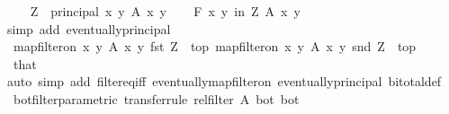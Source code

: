 \begin{isabellebody}
%
\isadelimproof
%
\endisadelimproof
%
\isatagproof
{}\isamarkupfalse%
\isanewline
\ \ \isamarkupfalse%
\ {\isacharquery}{\kern0pt}Z\ {\isacharequal}{\kern0pt}\ {\isachardoublequoteopen}principal\ {\isacharbraceleft}{\kern0pt}{\isacharparenleft}{\kern0pt}x{\isacharcomma}{\kern0pt}\ y{\isacharparenright}{\kern0pt}{\isachardot}{\kern0pt}\ A\ x\ y{\isacharbraceright}{\kern0pt}{\isachardoublequoteclose}\isanewline
\ \ \isamarkupfalse%
\ {\isachardoublequoteopen}{\isasymforall}\isactrlsub F\ {\isacharparenleft}{\kern0pt}x{\isacharcomma}{\kern0pt}\ y{\isacharparenright}{\kern0pt}\ in\ {\isacharquery}{\kern0pt}Z{\isachardot}{\kern0pt}\ A\ x\ y{\isachardoublequoteclose}\ \isamarkupfalse%
{\isacharparenleft}{\kern0pt}simp\ add{\isacharcolon}{\kern0pt}\ eventually{\isacharunderscore}{\kern0pt}principal{\isacharparenright}{\kern0pt}\isanewline
\ \ \isamarkupfalse%
\ {\isachardoublequoteopen}map{\isacharunderscore}{\kern0pt}filter{\isacharunderscore}{\kern0pt}on\ {\isacharbraceleft}{\kern0pt}{\isacharparenleft}{\kern0pt}x{\isacharcomma}{\kern0pt}\ y{\isacharparenright}{\kern0pt}{\isachardot}{\kern0pt}\ A\ x\ y{\isacharbraceright}{\kern0pt}\ fst\ {\isacharquery}{\kern0pt}Z\ {\isacharequal}{\kern0pt}\ top{\isachardoublequoteclose}\ {\isachardoublequoteopen}map{\isacharunderscore}{\kern0pt}filter{\isacharunderscore}{\kern0pt}on\ {\isacharbraceleft}{\kern0pt}{\isacharparenleft}{\kern0pt}x{\isacharcomma}{\kern0pt}\ y{\isacharparenright}{\kern0pt}{\isachardot}{\kern0pt}\ A\ x\ y{\isacharbraceright}{\kern0pt}\ snd\ {\isacharquery}{\kern0pt}Z\ {\isacharequal}{\kern0pt}\ top{\isachardoublequoteclose}\isanewline
\ \ \ \ \isamarkupfalse%
\ that\ \isamarkupfalse%
{\isacharparenleft}{\kern0pt}auto\ simp\ add{\isacharcolon}{\kern0pt}\ filter{\isacharunderscore}{\kern0pt}eq{\isacharunderscore}{\kern0pt}iff\ eventually{\isacharunderscore}{\kern0pt}map{\isacharunderscore}{\kern0pt}filter{\isacharunderscore}{\kern0pt}on\ eventually{\isacharunderscore}{\kern0pt}principal\ bi{\isacharunderscore}{\kern0pt}total{\isacharunderscore}{\kern0pt}def{\isacharparenright}{\kern0pt}\isanewline
{}\isamarkupfalse%
%
\endisatagproof
{\isafoldproof}%
%
\isadelimproof
\isanewline
%
\endisadelimproof
\isanewline
{}\isamarkupfalse%
\ bot{\isacharunderscore}{\kern0pt}filter{\isacharunderscore}{\kern0pt}parametric\ {\isacharbrackleft}{\kern0pt}transfer{\isacharunderscore}{\kern0pt}rule{\isacharbrackright}{\kern0pt}{\isacharcolon}{\kern0pt}\ {\isachardoublequoteopen}rel{\isacharunderscore}{\kern0pt}filter\ A\ bot\ bot{\isachardoublequoteclose}\isanewline

\end{isabellebody}

